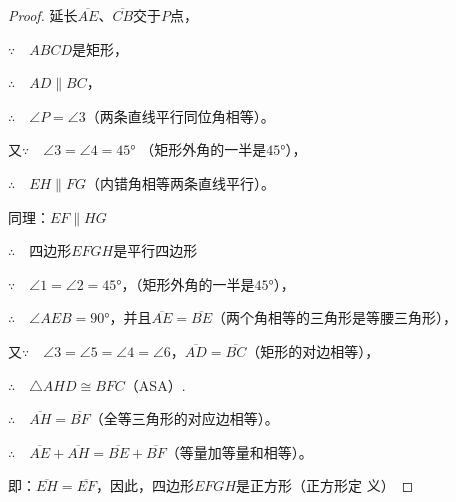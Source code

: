 \begin{proof}
延长$\overline{AE}$、$\overline{CB}$交于$P$点，

$\because\quad ABCD$是矩形，

$\therefore\quad AD\parallel BC$，

$\therefore\quad \angle P=\angle 3$（两条直线平行同位角相等）。

又$\because\quad \angle 3=\angle 4=\ang{45}$ （矩形外角的一半是$\ang{45}$），

$\therefore\quad EH\parallel FG$（内错角相等两条直线平行）。

同理：$EF\parallel HG$

$\therefore\quad $四边形$EFGH$是平行四边形

$\because\quad \angle 1=\angle 2=\ang{45}$，（矩形外角的一半是$\ang{45}$），

$\therefore\quad \angle AEB=\ang{90}$，并且$\overline{AE}=\overline{BE}$（两个角相等的三角形是等腰三角形），

又$\because\quad \angle 3=\angle 5=\angle 4=\angle 6$，$\overline{AD}=\overline{BC}$（矩形的对边相等），

$\therefore\quad \triangle AHD\cong BFC$（ASA）.

$\therefore\quad \overline{AH}=\overline{BF}$（全等三角形的对应边相等）。

$\therefore\quad \overline{AE}+\overline{AH}=\overline{BE}+\overline{BF}$（等量加等量和相等）。    

即：$\overline{EH}=\overline{EF}$，因此，四边形$EFGH$是正方形（正方形定
义）
\end{proof}

